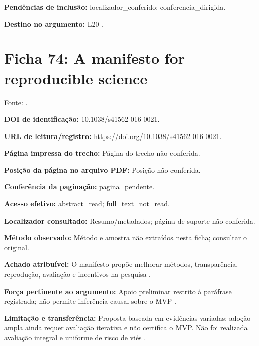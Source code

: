 \noindent\textbf{Pendências de inclusão:} localizador\_conferido; conferencia\_dirigida.\par\medskip

\noindent\textbf{Destino no argumento:} L20 .

\clearpage\section*{Ficha 74: A manifesto for reproducible science}

Fonte: \citet{SU04}.

\noindent\textbf{DOI de identificação:} 10.1038/s41562-016-0021.\par\medskip

\noindent\textbf{URL de leitura/registro:} \url{https://doi.org/10.1038/s41562-016-0021}.\par\medskip

\noindent\textbf{Página impressa do trecho:} Página do trecho não conferida.\par\medskip

\noindent\textbf{Posição da página no arquivo PDF:} Posição não conferida.\par\medskip

\noindent\textbf{Conferência da paginação:} pagina\_pendente.\par\medskip

\noindent\textbf{Acesso efetivo:} abstract\_read; full\_text\_not\_read.\par\medskip

\noindent\textbf{Localizador consultado:} Resumo/metadados; página de suporte não conferida.\par\medskip

\noindent\textbf{Método observado:} Método e amostra não extraídos nesta ficha; consultar o original.\par\medskip

\noindent\textbf{Achado atribuível:} O manifesto propõe melhorar métodos, transparência, reprodução, avaliação e incentivos na pesquisa \citep{SU04}.\par\medskip

\noindent\textbf{Força pertinente ao argumento:} Apoio preliminar restrito à paráfrase registrada; não permite inferência causal sobre o MVP \citep{SU04}.\par\medskip

\noindent\textbf{Limitação e transferência:} Proposta baseada em evidências variadas; adoção ampla ainda requer avaliação iterativa e não certifica o MVP. Não foi realizada avaliação integral e uniforme de risco de viés \citep{SU04}.\par\medskip


